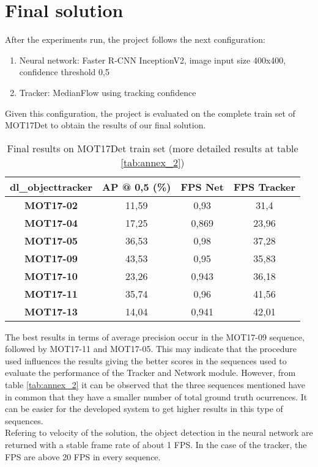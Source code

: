 \section{Final solution}
After the experiments run, the project follows the next configuration:
\begin{enumerate}
    \item Neural network: Faster R-CNN InceptionV2, image input size 400x400, confidence threshold 0,5
    \item Tracker: MedianFlow using tracking confidence
\end{enumerate}
Given this configuration, the project is evaluated on the complete train set of MOT17Det to obtain the results of our final solution.
\begin{table}[H]
\begin{center}
\begin{tabular}{|c|c|c|c|}
\hline
\textbf{dl\_objecttracker} & \textbf{AP @ 0,5 (\%)} & \textbf{FPS Net} & \multicolumn{1}{l|}{\textbf{FPS Tracker}} \\ \hline
\textbf{MOT17-02}          & 11,59                  & 0,93             & 31,4                                      \\ \hline
\textbf{MOT17-04}          & 17,25                  & 0,869            & 23,96                                     \\ \hline
\textbf{MOT17-05}          & 36,53                  & 0,98             & 37,28                                     \\ \hline
\textbf{MOT17-09}          & 43,53                  & 0,95             & 35,83                                     \\ \hline
\textbf{MOT17-10}          & 23,26                  & 0,943            & 36,18                                     \\ \hline
\textbf{MOT17-11}          & 35,74                  & 0,96             & 41,56                                     \\ \hline
\textbf{MOT17-13}          & 14,04                  & 0,941            & 42,01                                     \\ \hline
\end{tabular}
\end{center}
\caption{Final results on MOT17Det train set (more detailed results at table \ref{tab:annex_2})}
\label{tab:final}
\end{table}
The best results in terms of average precision occur in the MOT17-09 sequence, followed by MOT17-11 and MOT17-05. This may indicate that the procedure used influences the results giving the better scores in the sequences used to evaluate the performance of the Tracker and Network module. However, from table \ref{tab:annex_2} it can be observed that the three sequences mentioned have in common that they have a smaller number of total ground truth ocurrences. It can be easier for the developed system to get higher results in this type of sequences.\\
Refering to velocity of the solution, the object detection in the neural network are returned with a stable frame rate of about 1 FPS. In the case of the tracker, the FPS are above 20 FPS in every sequence.